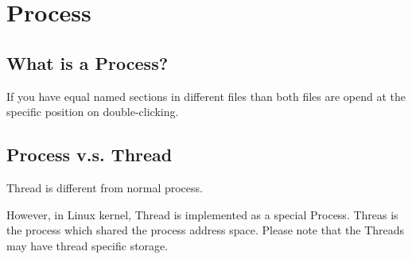 \chapter{Process}
\label{chap5}
\thispagestyle{empty}

\section{What is a Process?}

If you have equal named sections in different files than both 
files are opend at the specific position on double-clicking.

\section{Process v.s. Thread}
Thread is different from normal process.

However, in Linux kernel, Thread is implemented as a special Process. Threas is the process which shared the process address space. Please note that the Threads may have thread specific storage.
